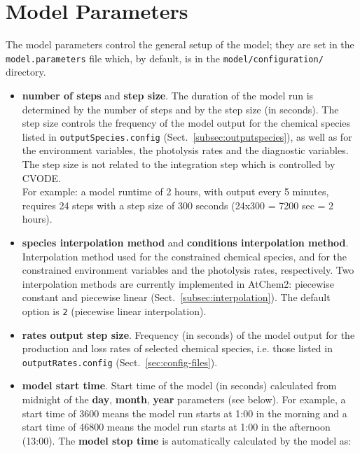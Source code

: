 \section{Model Parameters} \label{sec:model-parameters}

The model parameters control the general setup of the model; they are
set in the \texttt{model.parameters} file which, by default, is
in the \texttt{model/configuration/} directory.

\begin{itemize}
\item \textbf{number of steps} and \textbf{step size}. The duration of
  the model run is determined by the number of steps and by the step
  size (in seconds). The step size controls the frequency of the model
  output for the chemical species listed in \texttt{outputSpecies.config}
  (Sect.~\ref{subsec:outputspecies}), as well as for the environment
  variables, the photolysis rates and the diagnostic variables. The
  step size is not related to the integration step which is controlled
  by CVODE.\\
  For example: a model runtime of 2 hours, with output every 5
  minutes, requires 24 steps with a step size of 300 seconds (24x300 =
  7200 sec = 2 hours).
\item \textbf{species interpolation method} and
  \textbf{conditions interpolation method}. Interpolation method used
  for the constrained chemical species, and for the constrained
  environment variables and the photolysis rates, respectively. Two
  interpolation methods are currently implemented in AtChem2:
  piecewise constant and piecewise linear
  (Sect.~\ref{subsec:interpolation}). The default option is \texttt{2}
  (piecewise linear interpolation).
\item \textbf{rates output step size}. Frequency (in seconds) of the
  model output for the production and loss rates of selected chemical
  species, i.e. those listed in \texttt{outputRates.config}
  (Sect.~\ref{sec:config-files}).
\item \textbf{model start time}. Start time of the model (in seconds)
  calculated from midnight of the \textbf{day}, \textbf{month},
  \textbf{year} parameters (see below). For example, a start time of
  3600 means the model run starts at 1:00 in the morning and a start
  time of 46800 means the model run starts at 1:00 in the afternoon
  (13:00). The \textbf{model stop time} is automatically calculated by
  the model as:
  \begin{verbatim}

\end{verbatim}
\end{itemize}
